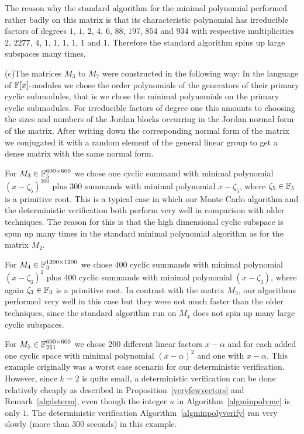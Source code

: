 The reason why the standard algorithm for the minimal polynomial
performed rather badly on this matrix is that its characteristic polynomial
has irreducible factors of degrees $1$, $1$, $2$, $4$, $6$, $88$,
$197$, $854$ and $934$ with respective multiplicities
$2$, $2277$, $4$, $1$, $1$, $1$, $1$, $1$ and $1$.
Therefore the standard algorithm spins up large subspaces
many times.

(c)\quad The matrices $M_3$ to $M_7$ were constructed in the following way:
In the language of $\mathbb{F}[x]$-modules we chose the order polynomials of
the generators of their primary cyclic submodules, that is we chose the
minimal polynomials on the primary cyclic submodules. For irreducible factors
of degree one this amounts to choosing the sizes and numbers of the
Jordan blocks occurring in the Jordan normal form of the matrix.
After writing down the corresponding normal form of the matrix we
conjugated it with a random element of the general linear group to
get a dense matrix with the same normal form.

For $M_3 \in \mathbb{F}_5^{600 \times 600}$ we chose one cyclic summand with
minimal polynomial $(x-\zeta_5)^{300}$ plus 300 summands with minimal
polynomial $x-\zeta_5$, where $\zeta_5 \in \mathbb{F}_5$ is a primitive root.
This is a typical case in which our Monte Carlo algorithm and
the deterministic verification both perform very well in comparison
%
with older techniques. The reason for this is that the high dimensional
cyclic subspace is spun up many times in the standard minimal polynomial
algorithm as for the matrix $M_2$.

For $M_4 \in \mathbb{F}_3^{1200 \times 1200}$ we chose 400 cyclic summands with
minimal polynomial $(x-\zeta_3)^2$ plus 400 cyclic summands with
minimal polynomial $(x-\zeta_3)$, where again $\zeta_3 \in \mathbb{F}_3$ is
a primitive root. In contrast with the matrix $M_3$,  our algorithms 
performed very well in this case but they were not
much faster than the older techniques, since the standard algorithm
run on $M_4$ does not spin up many large cyclic subspaces.

For $M_5 \in \mathbb{F}_{251}^{600 \times 600}$ we chose 200 different linear
factors $x-\alpha$ and for each added one cyclic space with minimal polynomial
$(x-\alpha)^2$ and one with $x-\alpha$. This example originally was a
worst case scenario for our deterministic verification. However, since $k=2$ is 
%
quite small, a deterministic verification can be done relatively
cheaply as described in Proposition~\ref{veryfewvectors} and
Remark~\ref{algdeterm}, even though the integer $u$ in
Algorithm~\ref{algminpolymc} is only $1$. The deterministic
verification Algorithm~\ref{algminpolyverify} ran very slowly 
(more than 300 seconds) in this example.

